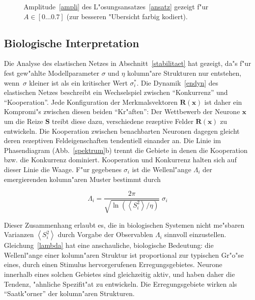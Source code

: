 \begin{figure}[t]
\begin{center}
\end{center}
\caption{Amplitude~\eqref{ampli} des L"osungsansatzes~\eqref{ansatz} gezeigt
f"ur  $A\in[0\ldots0.7]$ (zur besseren "Ubersicht farbig kodiert).}
\label{surface}
\end{figure}

\subsection{Biologische Interpretation}
\label{biointerpret}

Die Analyse des elastischen Netzes in Abschnitt~\ref{stabilitaet} hat
gezeigt, da"s f"ur fest gew"ahlte Modellparameter $\sigma$ und $\eta$
kolumn"are Strukturen nur entstehen, wenn~$\sigma$ kleiner ist als ein
kritischer Wert $\sigma_i^\ast$.  Die Dynamik~\eqref{endyn} des elastischen
Netzes beschreibt ein Wechselspiel zwischen ``Konkurrenz'' und
``Kooperation''.  Jede Konfiguration der Merkmalsvektoren $\mathbf{R(x)}$
ist daher ein Kompromi"s zwischen diesen beiden ``Kr"aften'': Der
Wettbewerb der Neurone $\mathbf{x}$ um die Reize $\mathbf{S}$ treibt diese
dazu, verschiedene rezeptive Felder $\mathbf{R(x)}$ zu entwickeln. Die
Kooperation zwischen benachbarten Neuronen dagegen gleicht deren rezeptiven
Feldeigenschaften tendentiell einander an.  Die Linie im Phasendiagram
(Abb.~\ref{spektrum}b) trennt die Gebiete in denen die Kooperation
bzw. die Konkurrenz dominiert. Kooperation und Konkurrenz halten sich auf
dieser Linie die Waage. F"ur gegebenes $\sigma_i$ ist die Wellenl"ange
$\Lambda_i$ der emergierenden kolumn"aren Muster bestimmt durch

\begin{equation}
\Lambda_i = \frac{2 \pi}{\sqrt{\ln\left(\left<S_i^2\right>/\eta\right)}}\;\sigma_i
\label{lambda}
\end{equation}

Dieser Zusammenhang erlaubt es, die in biologischen Systemen nicht
me"sbaren Varianzen $\left<S_i^2\right>$ durch Vorgabe der Observablen
$\Lambda_i$ sinnvoll einzustellen.  Gleichung~\eqref{lambda} hat eine
anschauliche, biologische Bedeutung: die Wellenl"ange einer kolumn"aren
Struktur ist proportional zur typischen Gr"o"se eines, durch einen Stimulus
hervorgerufenen Erregungsgebietes. Neurone innerhalb eines solchen Gebietes
sind gleichzeitig aktiv, und haben daher die Tendenz, "ahnliche Spezifit"at
zu entwickeln. Die Erregungsgebiete wirken als ``Saatk"orner'' der
kolumn"aren Strukturen.
